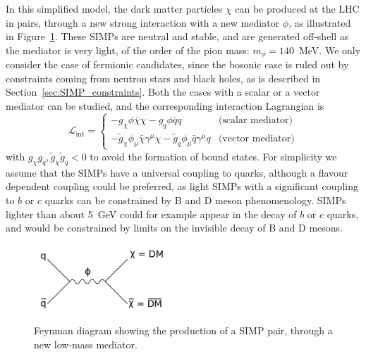 In this simplified model, the dark matter particles $\chi$ can be produced at the \ac{LHC} in pairs, through a new strong interaction with a new mediator $\phi$, as illustrated in Figure~\ref{fig:diagram}. These \acp{SIMP} are neutral and stable, and are generated off-shell as the mediator is very light, of the order of the pion mass: $m_{\phi} = 140$~MeV. We only consider the case of fermionic candidates, since the bosonic case is ruled out by constraints coming from neutron stars and black holes, as is described in Section~\ref{sec:SIMP_constraints}. Both the cases with a scalar or a vector mediator can be studied, and the corresponding interaction Lagrangian is
\begin{equation} \label{eq:SIMP_lagrangian}
 \mathcal{L}_{\mathrm{int}} = 
 \begin{cases}
  -g_{\chi}\phi\bar{\chi}\chi - g_q\phi\bar{q}q & \text{(scalar mediator)}\\
  -\tilde{g}_{\chi}\phi_{\mu}\bar{\chi}\gamma^{\mu}\chi - \tilde{g}_q\phi_{\mu}\bar{q}\gamma^{\mu}q & \text{(vector mediator)}
 \end{cases}
\end{equation}
with $g_{\chi}g_q,\tilde{g}_{\chi}\tilde{g}_q <0$ to avoid the formation of bound states. For simplicity we assume that the \acp{SIMP} have a universal coupling to quarks, although a flavour dependent coupling could be preferred, as light \acp{SIMP} with a significant coupling to $b$ or $c$ quarks can be constrained by B and D meson phenomenology. \acp{SIMP} lighter than about 5~GeV could for example appear in the decay of $b$ or $c$ quarks, and would be constrained by limits on the invisible decay of B and D mesons.

\begin{figure}[ht]
  \centering
  \includegraphics[width=0.45\textwidth]{diagram.pdf}\hfill%
  \caption{Feynman diagram showing the production of a SIMP pair, through a new low-mass mediator.}
  \label{fig:diagram}
\end{figure}

